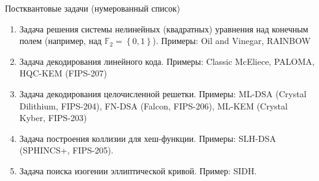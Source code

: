 \documentclass[aspectratio=169, 12pt]{beamer}
\begin{document}
\begin{frame}[label={sec:org8632b95}]{Постквантовые задачи (нумерованный список)}
    \begin{enumerate}[<+->]
        \item Задача решения системы нелинейных (квадратных) уравнения над конечным полем (например, над \(\mathbb{F}_{2}=\left\{0,1\right\}\)). Примеры: Oil and Vinegar, RAINBOW
        \item Задача декодирования линейного кода. Примеры: Classic McEliece, PALOMA, HQC-KEM (FIPS-207)
        \item Задача декодирования целочисленной решетки. Примеры: ML-DSA (Crystal Dilithium, FIPS-204), FN-DSA (Falcon, FIPS-206), ML-KEM (Crystal Kyber, FIPS-203)
        \item Задача построения коллизии для хеш-функции. Примеры: SLH-DSA (SPHINCS+, FIPS-205).
        \item Задача поиска изогении эллиптической кривой. Пример: SIDH.
    \end{enumerate}
\end{frame}
\end{document}
